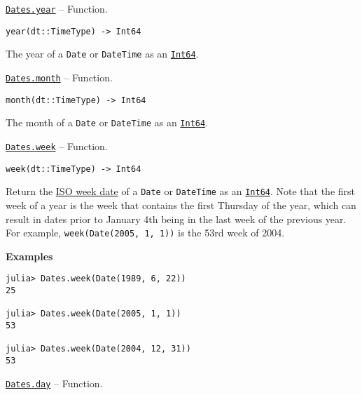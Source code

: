 \hypertarget{9714527822092754339}{}
\hyperlink{9714527822092754339}{\texttt{Dates.year}}  -- {Function.}

\begin{adjustwidth}{2em}{0pt}


\begin{verbatim}
year(dt::TimeType) -> Int64
\end{verbatim}

The year of a \texttt{Date} or \texttt{DateTime} as an \hyperlink{7720564657383125058}{\texttt{Int64}}.



\end{adjustwidth}
\hypertarget{3646624885120036576}{}
\hyperlink{3646624885120036576}{\texttt{Dates.month}}  -- {Function.}

\begin{adjustwidth}{2em}{0pt}


\begin{verbatim}
month(dt::TimeType) -> Int64
\end{verbatim}

The month of a \texttt{Date} or \texttt{DateTime} as an \hyperlink{7720564657383125058}{\texttt{Int64}}.



\end{adjustwidth}
\hypertarget{15002548627104558576}{}
\hyperlink{15002548627104558576}{\texttt{Dates.week}}  -- {Function.}

\begin{adjustwidth}{2em}{0pt}


\begin{verbatim}
week(dt::TimeType) -> Int64
\end{verbatim}

Return the \href{https://en.wikipedia.org/wiki/ISO\_week\_date}{ISO week date} of a \texttt{Date} or \texttt{DateTime} as an \hyperlink{7720564657383125058}{\texttt{Int64}}. Note that the first week of a year is the week that contains the first Thursday of the year, which can result in dates prior to January 4th being in the last week of the previous year. For example, \texttt{week(Date(2005, 1, 1))} is the 53rd week of 2004.

\textbf{Examples}


\begin{verbatim}
julia> Dates.week(Date(1989, 6, 22))
25

julia> Dates.week(Date(2005, 1, 1))
53

julia> Dates.week(Date(2004, 12, 31))
53
\end{verbatim}



\end{adjustwidth}
\hypertarget{15216601024330128019}{}
\hyperlink{15216601024330128019}{\texttt{Dates.day}}  -- {Function.}

